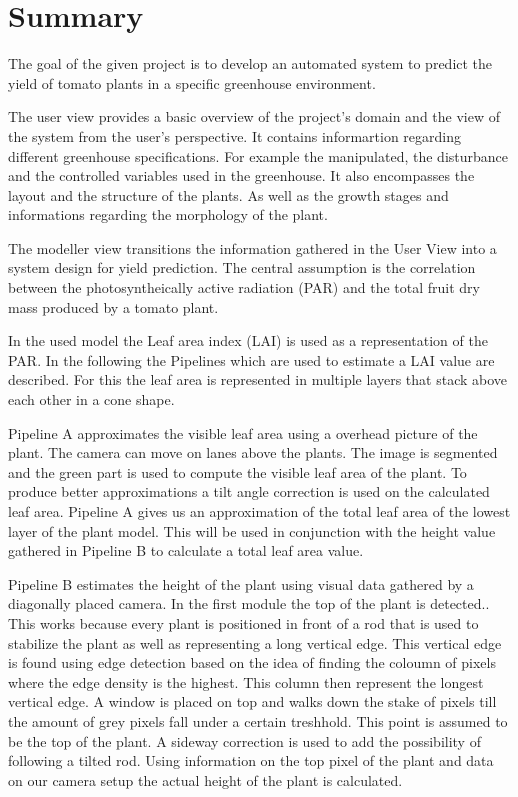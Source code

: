 \section{Summary}


The goal of the given project is to develop an automated system to predict the yield of tomato plants in a specific greenhouse environment. 

\smallskip

\noindent
The user view provides a basic overview of the project’s domain and the view of the system
from the user’s perspective. It contains informartion regarding different greenhouse specifications. For example the manipulated, the disturbance and the controlled variables used in the greenhouse. It also encompasses the layout and the structure of the plants. As well as the growth stages and informations regarding the morphology of the plant.

\smallskip

\noindent
The modeller view transitions the information gathered in the User View into a system design for yield prediction. The central assumption is the correlation between the photosyntheically active radiation (PAR) and the total fruit dry mass produced by a tomato plant.

\smallskip

\noindent
In the used model the Leaf area index (LAI) is used as a representation of the PAR. In the following the Pipelines which are used to estimate a LAI value are described. For this the leaf area is represented in multiple layers that stack above each other in a cone shape.

\smallskip

\noindent
Pipeline A approximates the visible leaf area using a overhead picture of the plant. The camera can move on lanes above the plants. The image is segmented and the green part is used to compute the visible leaf area of the plant. To produce better approximations a tilt angle correction is used on the calculated leaf area. Pipeline A gives us an approximation of the total leaf area of the lowest layer of the plant model. This will be used in conjunction with the height value gathered in Pipeline B to calculate a total leaf area value.

\smallskip

\noindent
Pipeline B estimates the height of the plant using visual data gathered by a diagonally placed camera. In the first module the top of the plant is detected.. This works because every plant is positioned in front of a rod that is used to stabilize the plant as well as representing a long vertical edge. This vertical edge is found using edge detection based on the idea of finding the coloumn of pixels where the edge density is the highest. This column then represent the longest vertical edge. A window is placed on top and walks down the stake of pixels till the amount of grey pixels fall under a certain treshhold. This point is assumed to be the top of the plant. A sideway correction is used to add the possibility of following a tilted rod. Using information on the top pixel of the plant and data on our camera setup the actual height of the plant is calculated.

